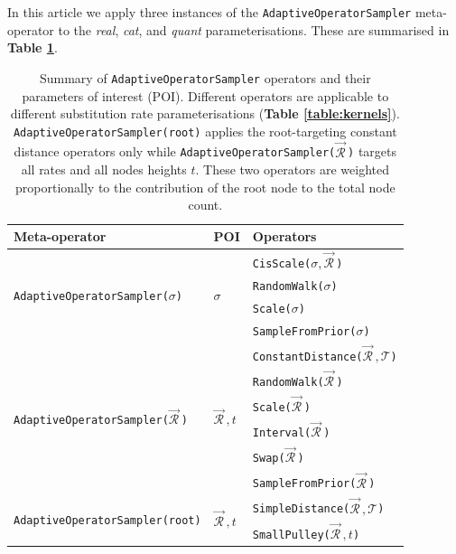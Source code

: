 \documentclass[10pt,letterpaper]{article}
\begin{document}
In this article we apply three instances of the \texttt{AdaptiveOperatorSampler} meta-operator to the \textit{real}, \textit{cat}, and \textit{quant} parameterisations. 
These are summarised in \textbf{Table \ref{table:adaptiveSampling}}.



\begin{table}[h!]
\centering
\begin{tabular}{|l l l|} 
 \hline
 Meta-operator & POI & Operators \\
\hline
 \multirow{4}{*}{\texttt{AdaptiveOperatorSampler($\sigma$)}} & \multirow{4}{*}{$\sigma$} & \texttt{CisScale($\sigma, \vec{\mathcal{R}}^{\,}$)} \\ 
 && \texttt{RandomWalk($\sigma$)}  \\
 && \texttt{Scale($\sigma$)}  \\
 && \texttt{SampleFromPrior($\sigma$)}  \\
 \hline
  \multirow{6}{*}{\texttt{AdaptiveOperatorSampler($\vec{\mathcal{R}}^{\,}$)}} & \multirow{6}{*}{$\vec{\mathcal{R}}^{\,}, t$} & \texttt{ConstantDistance($\vec{\mathcal{R}}^{\,}, \mathcal{T}$)}   \\ 
&& \texttt{RandomWalk($\vec{\mathcal{R}}^{\,}$)}  \\
&& \texttt{Scale($\vec{\mathcal{R}}^{\,}$)}   \\
&& \texttt{Interval($\vec{\mathcal{R}}^{\,}$)}   \\
&& \texttt{Swap($\vec{\mathcal{R}}^{\,}$)}  \\
&& \texttt{SampleFromPrior($\vec{\mathcal{R}}^{\,}$)} \\
 \hline
   \multirow{2}{*}{\texttt{AdaptiveOperatorSampler(root)}} & \multirow{2}{*}{$\vec{\mathcal{R}}^{\,}, t$} & \texttt{SimpleDistance($\vec{\mathcal{R}}^{\,}, \mathcal{T}$)}  \\ 
&&  \texttt{SmallPulley($\vec{\mathcal{R}}^{\,}, t$)}  \\
 \hline
\end{tabular}
\caption{Summary of \texttt{AdaptiveOperatorSampler} operators and their parameters of interest (POI).
Different operators are applicable to different substitution rate parameterisations (\textbf{Table \ref{table:kernels}}). 
\texttt{AdaptiveOperatorSampler(root)} applies the root-targeting constant distance operators only \cite{zhang2020improving} while \texttt{AdaptiveOperatorSampler($\vec{\mathcal{R}}^{\,}$)} targets all rates and all nodes heights $t$. 
These two operators are weighted proportionally to the contribution of the root node to the total node count. }
\label{table:adaptiveSampling}
\end{table}
\end{document}
